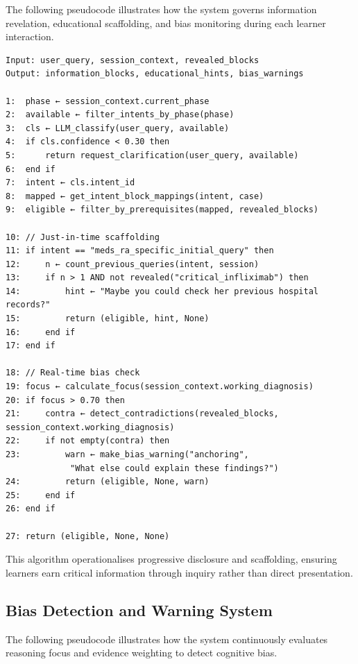 \noindent
The following pseudocode illustrates how the system governs information revelation,
educational scaffolding, and bias monitoring during each learner interaction.

\begin{verbatim}
Input: user_query, session_context, revealed_blocks
Output: information_blocks, educational_hints, bias_warnings

1:  phase ← session_context.current_phase
2:  available ← filter_intents_by_phase(phase)
3:  cls ← LLM_classify(user_query, available)
4:  if cls.confidence < 0.30 then
5:      return request_clarification(user_query, available)
6:  end if
7:  intent ← cls.intent_id
8:  mapped ← get_intent_block_mappings(intent, case)
9:  eligible ← filter_by_prerequisites(mapped, revealed_blocks)

10: // Just-in-time scaffolding
11: if intent == "meds_ra_specific_initial_query" then
12:     n ← count_previous_queries(intent, session)
13:     if n > 1 AND not revealed("critical_infliximab") then
14:         hint ← "Maybe you could check her previous hospital records?"
15:         return (eligible, hint, None)
16:     end if
17: end if

18: // Real-time bias check
19: focus ← calculate_focus(session_context.working_diagnosis)
20: if focus > 0.70 then
21:     contra ← detect_contradictions(revealed_blocks, session_context.working_diagnosis)
22:     if not empty(contra) then
23:         warn ← make_bias_warning("anchoring",
             "What else could explain these findings?")
24:         return (eligible, None, warn)
25:     end if
26: end if

27: return (eligible, None, None)
\end{verbatim}

\noindent
This algorithm operationalises progressive disclosure and scaffolding, ensuring
learners earn critical information through inquiry rather than direct
presentation.

\newpage

\subsection{Bias Detection and Warning System}
\label{sec:algo_bias}

\noindent
The following pseudocode illustrates how the system continuously evaluates reasoning
focus and evidence weighting to detect cognitive bias.

